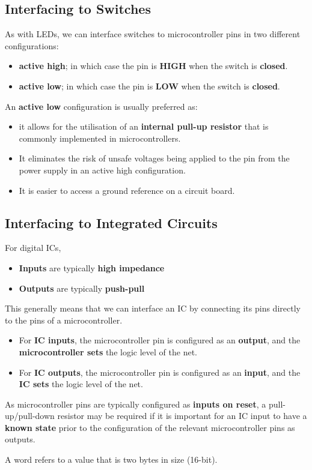 \documentclass[a4paper]{report}
\begin{document}
\subsection{Interfacing to Switches}
As with LEDs, we can interface switches to microcontroller pins in two different configurations:
\begin{itemize}
    \item \textbf{active high}; in which case the pin is \textbf{HIGH} when the switch is \textbf{closed}.
    \item \textbf{active low}; in which case the pin is \textbf{LOW} when the switch is \textbf{closed}.
\end{itemize}
An \textbf{active low} configuration is usually preferred as:
\begin{itemize}
    \item it allows for the utilisation of an \textbf{internal pull-up resistor} that is commonly
          implemented in microcontrollers.
    \item It eliminates the risk of unsafe voltages being applied to the pin from the power supply in an active high configuration.
    \item It is easier to access a ground reference on a circuit board.
\end{itemize}
\subsection{Interfacing to Integrated Circuits}
For digital ICs,
\begin{itemize}
    \item \textbf{Inputs} are typically \textbf{high impedance}
    \item \textbf{Outputs} are typically \textbf{push-pull}
\end{itemize}
This generally means that we can interface an IC by connecting its pins directly to the pins of a microcontroller.
\begin{itemize}
    \item For \textbf{IC inputs}, the microcontroller pin is configured as an \textbf{output},
          and the \textbf{microcontroller sets} the logic level of the net.
    \item For \textbf{IC outputs}, the microcontroller pin is configured as an \textbf{input},
          and the \textbf{IC sets} the logic level of the net.
\end{itemize}
As microcontroller pins are typically configured as \textbf{inputs on reset}, a
pull-up/pull-down resistor may be required if it is important for an IC input to
have a \textbf{known state} prior to the configuration of the relevant microcontroller pins as outputs.
\begin{definition}[Word]
    A word refers to a value that is two bytes in size (16-bit).
\end{definition}
\end{document}
